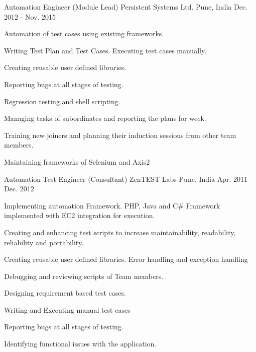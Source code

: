 \begin{cventries}
  \cventry
    {Automation Engineer (Module Lead)} %
    {Persistent Systems Ltd.} %
    {Pune, India} %
    {Dec. 2012 - Nov. 2015} %
    {
      \begin{cvitems} %
      \item {Automation of test cases using existing frameworks.}
      \item {Writing Test Plan and Test Cases. Executing test cases manually.}
       \item {Creating reusable user defined libraries.}
      \item {Reporting bugs at all stages of testing.}
     \item {Regression testing and shell scripting.}
     \item {Managing tasks of subordinates and reporting the plans for week.}
     \item {Training new joiners and planning their induction sessions from other team members.}
   \item {Maintaining frameworks of Selenium and Axis2}
      \end{cvitems}
    }

  \cventry
    {Automation Test Engineer (Consultant)} %
    {ZenTEST Labs} %
    {Pune, India} %
    {Apr. 2011 - Dec. 2012} %
    {
      \begin{cvitems} %
        \item {Implementing automation Framework. PHP, Java and C\# Framework implemented with EC2 integration for execution.}
        \item {Creating and enhancing test scripts to increase maintainability, readability, reliability and portability.}
        \item {Creating reusable user defined libraries. Error handling and exception handling}
        \item {Debugging and reviewing scripts of Team members.}
        \item {Designing requirement based test cases.}
       \item {Writing and Executing manual test cases}
       \item {Reporting bugs at all stages of testing.}
      \item {Identifying functional issues with the application.}
      \end{cvitems}
    }


\end{cventries}
